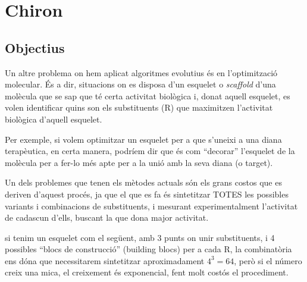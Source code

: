 %

\chapter{Chiron} %
\label{cha:Chiron}

\section{Objectius} %
	\label{sec:Introduccio}
	Un altre problema on hem aplicat algoritmes evolutius és en l'optimització
	molecular.  És a dir, situacions on es disposa d'un esquelet o
	\textit{scaffold} d'una molècula que se sap que té certa activitat biològica
	i, donat aquell esquelet, es volen identificar quins son els substituents
	(R) que maximitzen l'activitat biològica d'aquell esquelet.	

	Per exemple, si volem optimitzar un esquelet per a que s'uneixi a una diana
	terapèutica, en certa manera, podríem dir que és com ``decorar'' l'esquelet
	de la molècula per a fer-lo més apte per a la unió amb la seva diana (o
	target).

	Un dels problemes que tenen els mètodes actuals són els grans costos
	que es deriven d'aquest procés, ja que el que es fa és sintetitzar TOTES les
	possibles variants i combinacions de substituents, i mesurant
	experimentalment l'activitat de cadascun d'ells, buscant la que dona major
	activitat.

	si tenim un esquelet com el següent, amb 3 punts on unir substituents,
	i 4 possibles ``blocs de construcció'' (building blocs) per a cada R, la
	combinatòria ens dóna que necessitarem sintetitzar aproximadament $4^3 =
	64 $, però si el número creix una mica, el creixement és exponencial, fent
	molt costós el procediment.

